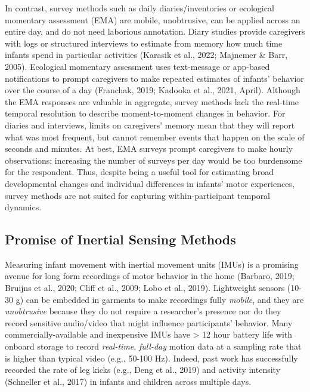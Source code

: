 \documentclass[
  man]{apa6}
\begin{document}
In contrast, survey methods such as daily diaries/inventories or ecological momentary assessment (EMA) are mobile, unobtrusive, can be applied across an entire day, and do not need laborious annotation. Diary studies provide caregivers with logs or structured interviews to estimate from memory how much time infants spend in particular activities (Karasik et al., 2022; Majnemer \& Barr, 2005). Ecological momentary assessment uses text-message or app-based notifications to prompt caregivers to make repeated estimates of infants' behavior over the course of a day (Franchak, 2019; Kadooka et al., 2021, April). Although the EMA responses are valuable in aggregate, survey methods lack the real-time temporal resolution to describe moment-to-moment changes in behavior. For diaries and interviews, limits on caregivers' memory mean that they will report what was most frequent, but cannot remember events that happen on the scale of seconds and minutes. At best, EMA surveys prompt caregivers to make hourly observations; increasing the number of surveys per day would be too burdensome for the respondent. Thus, despite being a useful tool for estimating broad developmental changes and individual differences in infants' motor experiences, survey methods are not suited for capturing within-participant temporal dynamics.

\hypertarget{promise-of-inertial-sensing-methods}{%
\subsection{Promise of Inertial Sensing Methods}\label{promise-of-inertial-sensing-methods}}

Measuring infant movement with inertial movement units (IMUs) is a promising avenue for long form recordings of motor behavior in the home (Barbaro, 2019; Bruijns et al., 2020; Cliff et al., 2009; Lobo et al., 2019). Lightweight sensors (10-30 g) can be embedded in garments to make recordings fully \emph{mobile}, and they are \emph{unobtrusive} because they do not require a researcher's presence nor do they record sensitive audio/video that might influence participants' behavior. Many commercially-available and inexpensive IMUs have \textgreater{} 12 hour battery life with onboard storage to record \emph{real-time}, \emph{full-day} motion data at a sampling rate that is higher than typical video (e.g., 50-100 Hz). Indeed, past work has successfully recorded the rate of leg kicks (e.g., Deng et al., 2019) and activity intensity (Schneller et al., 2017) in infants and children across multiple days.
\end{document}
